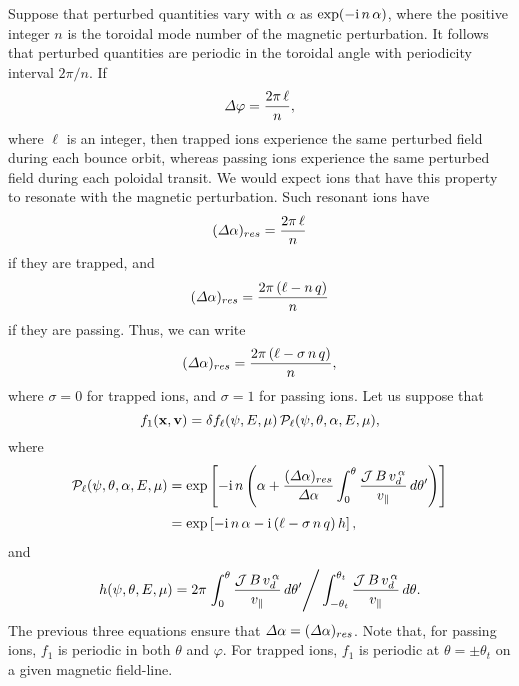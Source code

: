 \documentclass[12pt,prb,aps,notitlepage]{revtex4-1}
\begin{document}
 Suppose that perturbed quantities vary with $\alpha$ as $\exp(-{\rm i}\,n\,\alpha)$, where the positive integer $n$ is the toroidal
 mode number of the magnetic perturbation. It follows that perturbed quantities are periodic in the toroidal angle with periodicity interval $2\pi/n$. If
 \begin{equation}
 {\mit\Delta}\varphi = \frac{2\pi\,\ell}{n},
 \end{equation}
 where $\ell$ is an integer, then trapped ions experience the same perturbed field during each  bounce orbit, whereas passing
 ions experience the same perturbed field during each poloidal transit.  We would expect ions that have this property to resonate with the
 magnetic perturbation. Such resonant ions have
 \begin{equation}
 ({\mit\Delta}\alpha)_{res} = \frac{2\pi\,\ell}{n}
 \end{equation}
 if they are trapped, and 
 \begin{equation}
 ({\mit\Delta}\alpha)_{res} = \frac{2\pi\,(\ell-n\,q)}{n}
 \end{equation}
 if they are passing.
Thus, we can write
  \begin{equation}
 ({\mit\Delta}\alpha)_{res} = \frac{2\pi\,(\ell-\sigma\,n\,q)}{n},
 \end{equation}
 where $\sigma=0$ for trapped ions, and $\sigma=1$ for passing ions. Let us suppose that
 \begin{equation}\label{e83}
 f_1({\bf x},{\bf v})= \delta f_{\ell}(\psi,E,\mu)\,{\cal P}_{\ell}(\psi,\theta,\alpha,E,\mu),
 \end{equation}
 where
 \begin{align}
 {\cal P}_\ell(\psi,\theta,\alpha,E,\mu)& = \exp\left[-{\rm i}\,n\left(\alpha + \frac{({\mit\Delta}\alpha)_{res}}{{\mit\Delta}\alpha}\int_0^\theta\frac{{\cal J}\,B\,v_d^{\,\alpha}}{v_\parallel}\, d\theta'\right)\right]\nonumber\\[0.5ex]
 & = \exp\left[-{\rm i}\,n\,\alpha -{\rm i}\,(\ell - \sigma\,n\,q)\,h\right],
 \end{align}
 and
 \begin{equation}\label{e85}
 h(\psi,\theta,E,\mu)=2\pi \left.\int_0^\theta\frac{{\cal J}\,B\,v_d^{\,\alpha}}{v_\parallel}\, d\theta' \right/
 \int_{-\theta_t}^{\theta_t}\frac{{\cal J}\,B\,v_d^{\,\alpha}}{v_\parallel}\,d\theta.
 \end{equation}
 The previous three equations ensure that ${\mit\Delta}\alpha= ({\mit\Delta}\alpha)_{res}$. Note that, for passing ions, $f_1$ is periodic in both $\theta$ and
 $\varphi$. For trapped ions, $f_1$ is periodic at $\theta=\pm \theta_t$ on a given magnetic field-line.  
 
\end{document}
